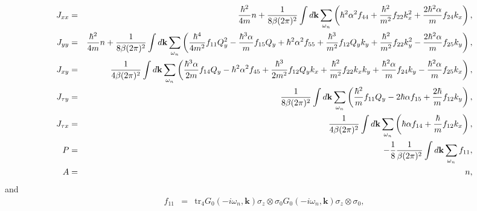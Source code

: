 \documentclass[prl,aps,twocolumn,showpacs, floatfix]{revtex4}
\begin{document}
\begin{widetext}

\begin{eqnarray}
J_{xx} & =&\frac{\hbar^{2}}{4m}n+\frac{1}{8\beta (2\pi)^2}\int d\mathbf{k}%
\sum_{\omega_n} \left(\hbar^{2}\alpha^{2}f_{44}+\frac{\hbar^{2}}{m^{2}}%
f_{22}k_{x}^{2}+ \frac{2\hbar^{2}\alpha}{m}f_{24}k_{x}\right), \\
J_{yy} & =&\frac{\hbar^{2}}{4m}n+\frac{1}{8\beta (2\pi)^2}\int d\mathbf{k}
\sum_{\omega_n} \left(\frac{\hbar^{4}}{4m^{2}}f_{11}Q_{y}^{2}-\frac{%
\hbar^{3}\alpha}{m}f_{15}Q_{y}+ \hbar^{2}\alpha^{2}f_{55}+\frac{\hbar^{3}}{%
m^{2}}f_{12}Q_{y}k_{y}+ \frac{\hbar^{2}}{m^{2}}f_{22}k_{y}^{2}-\frac{%
2\hbar^{2}\alpha}{m}f_{25}k_{y}\right), \\
J_{xy} & =&\frac{1}{4\beta (2\pi)^2}\int d\mathbf{k}\sum_{\omega_n}\left(
\frac{\hbar^{3}\alpha}{2m}f_{14}Q_{y}-\hbar^{2}\alpha^{2}f_{45}+ \frac{%
\hbar^{3}}{2m^{2}}f_{12}Q_{y}k_{x}+\frac{\hbar^{2}}{m^{2}}f_{22}k_{x}k_{y}+
\frac{\hbar^{2}\alpha}{m}f_{24}k_{y}-\frac{\hbar^{2}\alpha}{m}%
f_{25}k_{x}\right), \\
J_{\tau y} & =&\frac{1}{8\beta (2\pi)^2} \int d\mathbf{k}\sum_{\omega_n}
\left(\frac{\hbar^{2}}{m}f_{11}Q_{y}-2\hbar\alpha f_{15}+\frac{2\hbar}{m}%
f_{12}k_{y}\right), \\
J_{\tau x} & =&\frac{1}{4\beta (2\pi)^2}\int d\mathbf{k} \sum_{\omega_n}
\left(\hbar\alpha f_{14}+\frac{\hbar}{m}f_{12}k_{x}\right), \\
P & =&-\frac{1}{8}\frac{1}{\beta (2\pi)^2}\int d\mathbf{k}%
\sum_{\omega_n}f_{11}, \\
A & =&n,
\end{eqnarray}
and
\begin{eqnarray}
f_{11} & =&\text{tr}_{4}G_{0}(-i\omega_{n},\mathbf{k})\sigma_{z}\otimes%
\sigma_{0}{G}_{0}(-i\omega_{n},\mathbf{k})\sigma_{z}\otimes\sigma_{0}, \\

\end{eqnarray}
\end{widetext}
\end{document}
